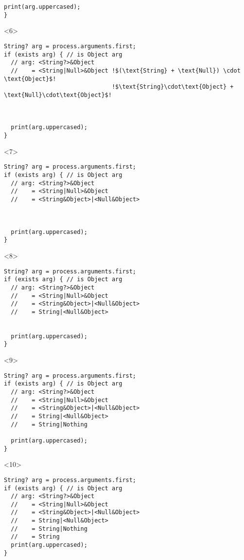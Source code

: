\documentclass[aspectratio=169]{beamer}
\begin{document}
\begin{frame}[fragile]
\begin{onlyenv}
\begin{lstlisting}[escapechar=!]
  print(arg.uppercased);
}
    \end{lstlisting}
  \end{onlyenv}
  \begin{onlyenv}<6>
    \begin{lstlisting}[escapechar=!]
String? arg = process.arguments.first;
if (exists arg) { // is Object arg
  // arg: <String?>&Object
  //    = <String|Null>&Object !$(\text{String} + \text{Null}) \cdot \text{Object}$!
                               !$\text{String}\cdot\text{Object} + \text{Null}\cdot\text{Object}$!



  print(arg.uppercased);
}
    \end{lstlisting}
  \end{onlyenv}
  \begin{onlyenv}<7>
    \begin{lstlisting}
String? arg = process.arguments.first;
if (exists arg) { // is Object arg
  // arg: <String?>&Object
  //    = <String|Null>&Object
  //    = <String&Object>|<Null&Object>



  print(arg.uppercased);
}
    \end{lstlisting}
  \end{onlyenv}
  \begin{onlyenv}<8>
    \begin{lstlisting}
String? arg = process.arguments.first;
if (exists arg) { // is Object arg
  // arg: <String?>&Object
  //    = <String|Null>&Object
  //    = <String&Object>|<Null&Object>
  //    = String|<Null&Object>


  print(arg.uppercased);
}
    \end{lstlisting}
  \end{onlyenv}
  \begin{onlyenv}<9>
    \begin{lstlisting}
String? arg = process.arguments.first;
if (exists arg) { // is Object arg
  // arg: <String?>&Object
  //    = <String|Null>&Object
  //    = <String&Object>|<Null&Object>
  //    = String|<Null&Object>
  //    = String|Nothing

  print(arg.uppercased);
}
    \end{lstlisting}
  \end{onlyenv}
  \begin{onlyenv}<10>
    \begin{lstlisting}
String? arg = process.arguments.first;
if (exists arg) { // is Object arg
  // arg: <String?>&Object
  //    = <String|Null>&Object
  //    = <String&Object>|<Null&Object>
  //    = String|<Null&Object>
  //    = String|Nothing
  //    = String
  print(arg.uppercased);
}
    \end{lstlisting}
  \end{onlyenv}
\end{frame}
\end{document}
